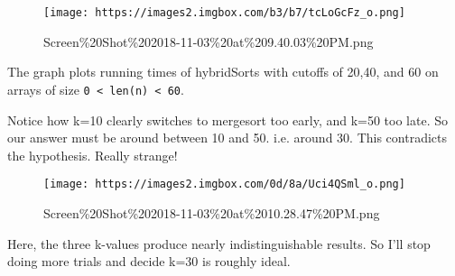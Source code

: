 \documentclass[11pt]{article}
\makeatletter
\def\maxwidth{\ifdim\Gin@nat@width>\linewidth\linewidth
    \else\Gin@nat@width\fi}
\let\Oldincludegraphics\includegraphics
\renewcommand{\includegraphics}[1]{\Oldincludegraphics[width=.8\maxwidth]{#1}}
\makeatother
\begin{document}
    \begin{figure}
\centering
\texttt{[image: https://images2.imgbox.com/b3/b7/tcLoGcFz\_o.png]}
\caption{Screen\%20Shot\%202018-11-03\%20at\%209.40.03\%20PM.png}
\end{figure}

The graph plots running times of hybridSorts with cutoffs of 20,40, and
60 on arrays of size \texttt{0\ \textless{}\ len(n)\ \textless{}\ 60}.

Notice how k=10 clearly switches to mergesort too early, and k=50 too
late. So our answer must be around between 10 and 50. i.e. around 30.
This contradicts the hypothesis. Really strange!

    \begin{figure}
\centering
\texttt{[image: https://images2.imgbox.com/0d/8a/Uci4QSml\_o.png]}
\caption{Screen\%20Shot\%202018-11-03\%20at\%2010.28.47\%20PM.png}
\end{figure}

Here, the three k-values produce nearly indistinguishable results. So
I'll stop doing more trials and decide k=30 is roughly ideal.
\end{document}
